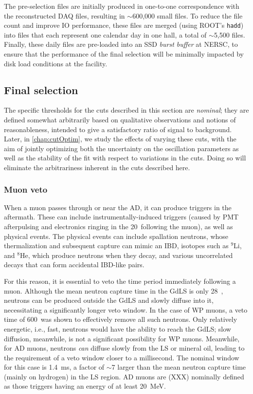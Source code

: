 \documentclass[../thesis.tex]{subfiles}
\begin{document}
The pre-selection files are initially produced in one-to-one correspondence with
the reconstructed DAQ files, resulting in $\sim$600,000 small files. To reduce
the file count and improve IO performance, these files are merged (using ROOT's
\texttt{hadd}) into files that each represent one calendar day in one hall, a
total of $\sim$5,500 files. Finally, these daily files are pre-loaded into an
SSD \emph{burst buffer} at NERSC, to ensure that the performance of the final
selection will be minimally impacted by disk load conditions at the facility.

\subsection{Final selection}
\label{sec:selFinalSel}

The specific thresholds for the cuts described in this section are
\emph{nominal}; they are defined somewhat arbitrarily based on qualitative
observations and notions of reasonableness, intended to give a satisfactory
ratio of signal to background. Later, in \autoref{chap:cutOptim}, we study the
effects of varying these cuts, with the aim of jointly optimizing both the
uncertainty on the oscillation parameters as well as the stability of the fit
with respect to variations in the cuts. Doing so will eliminate the
arbitrariness inherent in the cuts described here.

\subsubsection{Muon veto}
\label{sec:selMuonVeto}

When a muon passes through or near the AD, it can produce triggers in the
aftermath. These can include instrumentally-induced triggers (caused by PMT
afterpulsing and electronics ringing in the 20~\us following the muon), as well
as physical events. The physical events can include spallation neutrons, whose
thermalization and subsequent capture can mimic an IBD, isotopes such as $^9$Li,
and $^8$He, which produce neutrons when they decay, and various uncorrelated
decays that can form accidental IBD-like pairs.

For this reason, it is essential to veto the time period immediately following a
muon. Although the mean neutron capture time in the GdLS is only 28~\us,
neutrons can be produced outside the GdLS and slowly diffuse into it,
necessitating a significantly longer veto window. In the case of WP muons, a
veto time of 600~\us was shown to effectively remove all such neutrons. Only
relatively energetic, i.e., fast, neutrons would have the ability to reach the
GdLS; slow diffusion, meanwhile, is not a significant possibility for WP
muons. Meanwhile, for AD muons, neutrons \emph{can} diffuse slowly from the LS
or mineral oil, leading to the requirement of a veto window closer to a
millisecond. The nominal window for this case is 1.4~ms, a factor of $\sim$7
larger than the mean neutron capture time (mainly on hydrogen) in the LS
region. AD muons are (XXX) nominally defined as those triggers having an energy
of at least 20~MeV.
\end{document}
